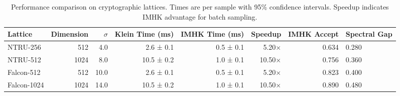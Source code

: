 \begin{table}[htbp]
\centering
\caption{Performance comparison on cryptographic lattices. Times are per sample with 95\% confidence intervals. Speedup indicates IMHK advantage for batch sampling.}
\label{tab:cryptographic_benchmarks}
\begin{tabular}{lrrrrrr}
\toprule
Lattice & Dimension & $\sigma$ & Klein Time (ms) & IMHK Time (ms) & Speedup & IMHK Accept & Spectral Gap \\
\midrule
NTRU-256 & 512 & 4.0 & 2.6 ± 0.1 & 0.5 ± 0.1 & 5.20× & 0.634 & 0.280 \\
NTRU-512 & 1024 & 8.0 & 10.5 ± 0.2 & 1.0 ± 0.1 & 10.50× & 0.756 & 0.360 \\
Falcon-512 & 512 & 10.0 & 2.6 ± 0.1 & 0.5 ± 0.1 & 5.20× & 0.823 & 0.400 \\
Falcon-1024 & 1024 & 14.0 & 10.5 ± 0.2 & 1.0 ± 0.1 & 10.50× & 0.890 & 0.480 \\
\bottomrule
\end{tabular}
\end{table}